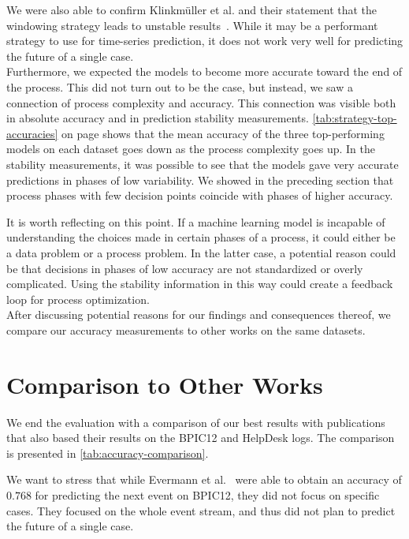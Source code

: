 We were also able to confirm Klinkmüller et al. and their statement that the windowing strategy leads to unstable results~\cite{klinkmuller2018reliablemonitoring}.
While it may be a performant strategy to use for time-series prediction, it does not work very well for predicting the future of a single case.\\

Furthermore, we expected the models to become more accurate toward the end of the process.
This did not turn out to be the case, but instead, we saw a connection of process complexity and accuracy.
This connection was visible both in absolute accuracy and in prediction stability measurements.
\autoref{tab:strategy-top-accuracies} on page \pageref{tab:strategy-top-accuracies} shows that the mean accuracy of the three top-performing models on each dataset goes down as the process complexity goes up.
In the stability measurements, it was possible to see that the models gave very accurate predictions in phases of low variability.
We showed in the preceding section that process phases with few decision points coincide with phases of higher accuracy.

It is worth reflecting on this point.
If a machine learning model is incapable of understanding the choices made in certain phases of a process, it could either be a data problem or a process problem.
In the latter case, a potential reason could be that decisions in phases of low accuracy are not standardized or overly complicated.
Using the stability information in this way could create a feedback loop for process optimization.\\

After discussing potential reasons for our findings and consequences thereof, we compare our accuracy measurements to other works on the same datasets.

\section{Comparison to Other Works}
We end the evaluation with a comparison of our best results with publications that also based their results on the BPIC12 and HelpDesk logs.
The comparison is presented in \autoref{tab:accuracy-comparison}.

We want to stress that while Evermann et al.~\cite{evermann2016} were able to obtain an accuracy of $0.768$ for predicting the next event on BPIC12, they did not focus on specific cases.
They focused on the whole event stream, and thus did not plan to predict the future of a single case.

